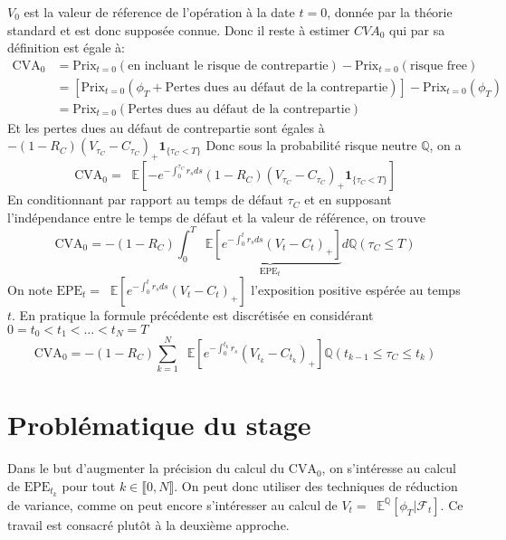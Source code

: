 \documentclass[a4paper,12pt]{report}
\numberwithin{equation}{section}
\theoremstyle{definition}
\newcommand*\E{\mathop{}\!\mathbb{E}}
\numberwithin{equation}{section}
\begin{document}
$V_0$ est la valeur de réference de l'opération à la date $t=0$, donnée par la théorie standard et est donc supposée connue. Donc il reste à estimer $CVA_0$ qui par sa définition est égale à:
\begin{equation*}
\begin{split}
\mbox{CVA}_0&=\mbox{Prix}_{t=0}(\mbox{en incluant le risque de contrepartie})-\mbox{Prix}_{t=0}(\mbox{risque free})\\
&=[\mbox{Prix}_{t=0}(\phi_T+\mbox{Pertes dues au défaut de la contrepartie})]-\mbox{Prix}_{t=0}(\phi_T)\\
&=\mbox{Prix}_{t=0}(\mbox{Pertes dues au défaut de la contrepartie})
\end{split}
\end{equation*}
Et les pertes dues au défaut de contrepartie sont égales à $-(1-R_C)(V_{\tau_C}-C_{\tau_C})_+\textbf{1}_{\{\tau_C<T\}}$
Donc sous la probabilité risque neutre $\mathbb{Q}$, on a
$$\mbox{CVA}_0=\E\left[-e^{-\int_0^{\tau_C}r_s ds}(1-R_C)(V_{\tau_C}-C_{\tau_C})_+\textbf{1}_{\{\tau_C<T\}}\right]$$
En conditionnant par rapport au temps de défaut $\tau_C$ et en supposant l'indépendance entre le temps de défaut et la valeur de référence, on trouve
$$\mbox{CVA}_0=-(1-R_C)\int_0^T\underbrace{\E\left[e^{-\int_0^{t}r_s ds}(V_t-C_t)_+\right]}_{\mbox{EPE}_t} d\mathbb{Q}(\tau_C\leq T)$$ 
On note $\mbox{EPE}_t=\E\left[e^{-\int_0^{t}r_s ds}(V_t-C_t)_+\right]$ l'exposition positive espérée au temps $t$. En pratique la formule précédente est discrétisée en considérant $0=t_{0}<t_{1}<\dots<t_{N}=T$
$$\mbox{CVA}_0=-(1-R_C)\sum_{k=1}^N\E \left[ e^{-\int_0^{t_k}r_s} \left( V_{t_k}-C_{t_k}\right)_+\right]\mathbb{Q}(t_{k-1}\leq \tau_C\leq t_k)$$
\section*{Problématique du stage}
Dans le but d'augmenter la précision du calcul du $\mbox{CVA}_0$, on s'intéresse au calcul de $\mbox{EPE}_{t_k}$ pour tout $k\in \llbracket 0,N\rrbracket$. On peut donc utiliser des techniques de réduction de variance, comme on peut encore s'intéresser au calcul de $V_t=\E^{\mathbb{Q}}\left[ \phi_T |\mathcal{F}_t \right]$. Ce travail est consacré plutôt à la deuxième approche. 
\end{document}
